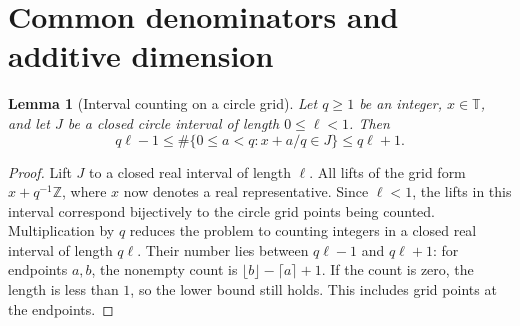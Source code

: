 \documentclass[12pt,leqno]{article}
\numberwithin{equation}{section}
\newtheorem{lemma}[theorem]{Lemma}
\theoremstyle{remark}
\newcommand{\LRtorus}{\mathbb T}
\newcommand{\LRinteger}{\mathbb Z}
\begin{document}
\section{Common denominators and additive dimension}


\begin{lemma}[Interval counting on a circle grid]\label{lem:gridcount}
Let $q\ge1$ be an integer, $x\in\LRtorus$, and let $J$ be a closed circle interval of length $0\le\ell<1$. Then
\begin{equation}\label{eq:gridcount}
q\ell-1\le\#\{0\le a<q:x+a/q\in J\}\le q\ell+1.
\end{equation}
\end{lemma}
\begin{proof}
Lift $J$ to a closed real interval of length $\ell$. All lifts of the grid form $x+q^{-1}\LRinteger$, where $x$ now denotes a real representative. Since $\ell<1$, the lifts in this interval correspond bijectively to the circle grid points being counted. Multiplication by $q$ reduces the problem to counting integers in a closed real interval of length $q\ell$. Their number lies between $q\ell-1$ and $q\ell+1$: for endpoints $a,b$, the nonempty count is $\lfloor b\rfloor-\lceil a\rceil+1$. If the count is zero, the length is less than $1$, so the lower bound still holds. This includes grid points at the endpoints.
\end{proof}
\end{document}
